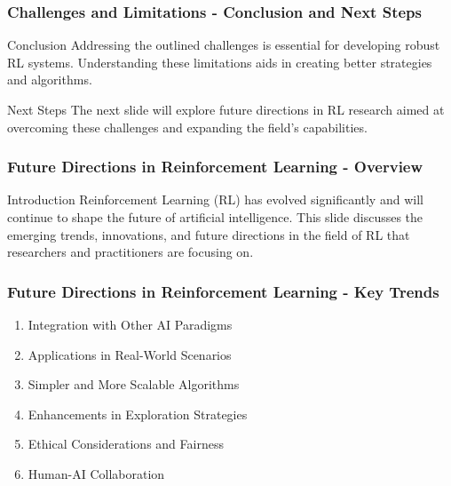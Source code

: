 \documentclass[aspectratio=169]{beamer}
\begin{document}
\begin{frame}[fragile]
  \frametitle{Challenges and Limitations - Conclusion and Next Steps}
  \begin{block}{Conclusion}
    Addressing the outlined challenges is essential for developing robust RL systems. Understanding these limitations aids in creating better strategies and algorithms.
  \end{block}
  
  \begin{block}{Next Steps}
    The next slide will explore future directions in RL research aimed at overcoming these challenges and expanding the field's capabilities.
  \end{block}
\end{frame}

\begin{frame}[fragile]
    \frametitle{Future Directions in Reinforcement Learning - Overview}
    \begin{block}{Introduction}
        Reinforcement Learning (RL) has evolved significantly and will continue to shape the future of artificial intelligence. This slide discusses the emerging trends, innovations, and future directions in the field of RL that researchers and practitioners are focusing on.
    \end{block}
\end{frame}

\begin{frame}[fragile]
    \frametitle{Future Directions in Reinforcement Learning - Key Trends}
    \begin{enumerate}
        \item Integration with Other AI Paradigms
        \item Applications in Real-World Scenarios
        \item Simpler and More Scalable Algorithms
        \item Enhancements in Exploration Strategies
        \item Ethical Considerations and Fairness
        \item Human-AI Collaboration
    \end{enumerate}
\end{frame}
\end{document}

